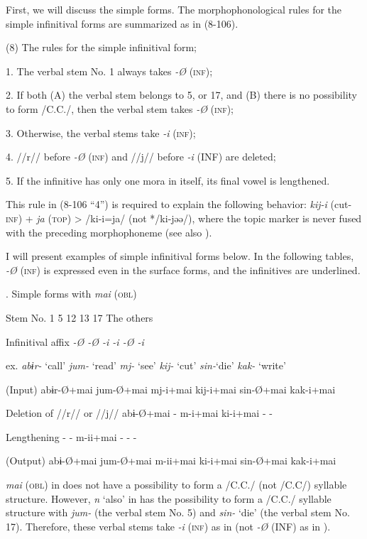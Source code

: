   First, we will discuss the simple forms. The morphophonological rules for the simple infinitival forms are summarized as in (8-106).

(8)  The rules for the simple infinitival form;

  1.  The verbal stem No. 1 always takes \textit{{}-Ø} (\textsc{inf});

  2.  If both (A) the verbal stem belongs to 5, or 17, and (B) there is no possibility to form /C.C./, then the verbal stem takes \textit{{}-Ø} (\textsc{inf});

  3.  Otherwise, the verbal stems take \textit{-i} (\textsc{inf});

  4.  //r// before \textit{{}-Ø} (\textsc{inf}) and //j// before \textit{{}-i} (INF) are deleted;

  5.  If the infinitive has only one mora in itself, its final vowel is lengthened.

This rule in (8-106 “4”) is required to explain the following behavior: \textit{kij-i} (cut-\textsc{inf}) + \textit{ja} (\textsc{top}) > /ki-i=ja/ (not */ki-jəə/), where the topic marker is never fused with the preceding morphophoneme (see also ).

I will present examples of simple infinitival forms below. In the following tables, \textit{{}-Ø} (\textsc{inf}) is expressed even in the surface forms, and the infinitives are underlined.

\begin{styleBeschriftung}
\textmd{}\textmd{. Simple forms with}\textmd{ \textit{mai}}\textmd{ (\textsc{obl})}
\end{styleBeschriftung}

Stem No.  1  5  12  13  17  The others

Infinitival affix  \textit{{}-Ø  {}-Ø  {}-i  {}-i  {}-Ø  {}-i}

ex.  \textit{abɨr-} ‘call’  \textit{jum-} ‘read’  \textit{mj-} ‘see’  \textit{kij-} ‘cut’  \textit{sin-}‘die’  \textit{kak-} ‘write’

(Input)  abɨr-Ø+mai  jum-Ø+mai  mj-i+mai  kij-i+mai  sin-Ø+mai  kak-i+mai

Deletion of //r// or //j//  abɨ-Ø+mai  {}-  m-i+mai  ki-i+mai  {}-  {}-

Lengthening  {}-  {}-  m-ii+mai  {}-  {}-  {}-

(Output)  abɨ-Ø+mai  jum-Ø+mai  m-ii+mai  ki-i+mai  sin-Ø+mai  kak-i+mai

\textit{mai} (\textsc{obl}) in  does not have a possibility to form a /C.C./ (not /C.C/) syllable structure. However, \textit{n} ‘also’ in  has the possibility to form a /C.C./ syllable structure with \textit{jum-} (the verbal stem No. 5) and \textit{sin-} ‘die’ (the verbal stem No. 17). Therefore, these verbal stems take \textit{-i} (\textsc{inf}) as in  (not \textit{{}-Ø} (INF) as in ).

